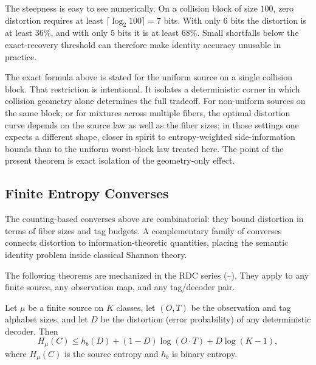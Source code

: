 \begin{remark}[Steepness]
The steepness is easy to see numerically. On a collision block of size $100$, zero distortion requires at least $\lceil \log_2 100 \rceil = 7$ bits. With only $6$ bits the distortion is at least $36\%$, and with only $5$ bits it is at least $68\%$. Small shortfalls below the exact-recovery threshold can therefore make identity accuracy unusable in practice.
\end{remark}

\begin{remark}
The exact formula above is stated for the uniform source on a single collision block. That restriction is intentional. It isolates a deterministic corner in which collision geometry alone determines the full tradeoff. For non-uniform sources on the same block, or for mixtures across multiple fibers, the optimal distortion curve depends on the source law as well as the fiber sizes; in those settings one expects a different shape, closer in spirit to entropy-weighted side-information bounds than to the uniform worst-block law treated here. The point of the present theorem is exact isolation of the geometry-only effect.
\end{remark}

\subsection{Finite Entropy Converses}\label{sec:entropy-converses}

The counting-based converses above are combinatorial: they bound distortion in terms of fiber sizes and tag budgets. A complementary family of converses connects distortion to information-theoretic quantities, placing the semantic identity problem inside classical Shannon theory.

The following theorems are mechanized in the RDC series (--). They apply to any finite source, any observation map, and any tag/decoder pair.

\begin{theorem}\label{thm:fano-converse}
Let $\mu$ be a finite source on $K$ classes, let $(O, T)$ be the observation and tag alphabet sizes, and let $D$ be the distortion (error probability) of any deterministic decoder. Then
\[
H_\mu(C) \le h_b(D) + (1-D) \log(O \cdot T) + D \log(K - 1),
\]
where $H_\mu(C)$ is the source entropy and $h_b$ is binary entropy.
\end{theorem}

